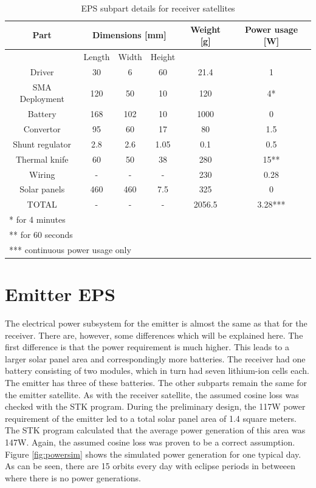 \documentclass[11pt,a4paper,twoside]{book}
\begin{document}
\begin{table}[H!]
\centering
\begin{tabular}{cccccc}
\toprule
Part & \multicolumn{3}{c}{Dimensions [mm]} & Weight [g] & Power usage [W]\\ 
\midrule
 & Length & Width & Height & & \\ 
 Driver & 30 & 6 & 60 & 21.4 & 1 \\ 
 SMA Deployment & 120 & 50 & 10 & 120 & 4* \\ 
 Battery & 168 & 102 & 10 & 1000 & 0 \\ 
 Convertor & 95 & 60 & 17 & 80 & 1.5 \\ 
 Shunt regulator & 2.8 & 2.6 & 1.05 & 0.1 & 0.5 \\ 
 Thermal knife & 60 & 50 & 38 & 280 & 15**  \\
 Wiring & - & - & - & 230 & 0.28 \\ 
 Solar panels & 460 & 460 & 7.5 & 325 & 0 \\
 \midrule
 TOTAL & - & - & - & 2056.5 & 3.28***  \\ 
\bottomrule
 \multicolumn{6}{l}{* for 4 minutes} \\
 \multicolumn{6}{l}{** for 60 seconds} \\
 \multicolumn{6}{l}{*** continuous power usage only} \\
\end{tabular}
\caption{EPS subpart details for receiver satellites}
\label{tab:EPS_details}
\end{table}


\chapter{Emitter EPS}
\label{emitter_EPS}

The electrical power subsystem for the emitter is almost the same as that for the receiver. There are, however, some differences which will be explained here. The first difference is that the power requirement is much higher. This leads to a larger solar panel area and correspondingly more batteries. The receiver had one battery consisting of two modules, which in turn had seven lithium-ion cells each. The emitter has three of these batteries. 
The other subparts remain the same for the emitter satellite.
As with the receiver satellite, the assumed cosine loss was checked with the STK program. During the preliminary design, the 117W power requirement of the emitter led to a total solar panel area of 1.4 square meters. The STK program calculated that the average power generation of this area was 147W. Again, the assumed cosine loss was proven to be a correct assumption. Figure \ref{fig:powersim} shows the simulated power generation for one typical day. As can be seen, there are 15 orbits every day with eclipse periods in betweeen where there is no power generations.
\end{document}
